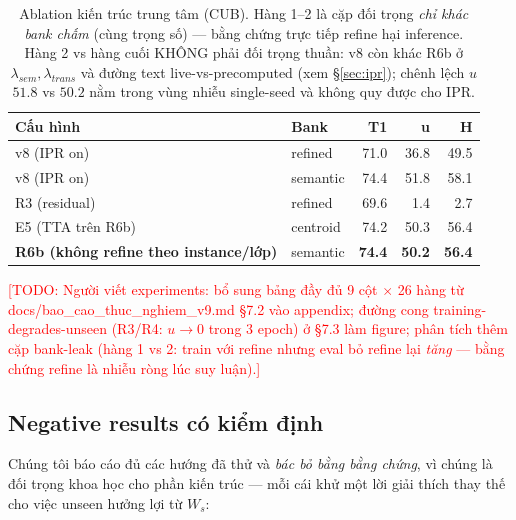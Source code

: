 \documentclass[10pt,twocolumn,letterpaper]{article}
\newcommand{\todo}[1]{\textcolor{red}{[TODO: #1]}}
\begin{document}
\begin{table}[t]
\centering
\caption{Ablation kiến trúc trung tâm (CUB). Hàng 1--2 là cặp đối trọng \emph{chỉ khác bank chấm} (cùng trọng số) — bằng chứng trực tiếp refine hại inference. Hàng 2 vs hàng cuối KHÔNG phải đối trọng thuần: v8 còn khác R6b ở $\lambda_{sem}, \lambda_{trans}$ và đường text live-vs-precomputed (xem §\ref{sec:ipr}); chênh lệch $u$ $51.8$ vs $50.2$ nằm trong vùng nhiễu single-seed và không quy được cho IPR.}
\label{tab:ablation-refine}
\small
\begin{tabular}{llrrr}
\toprule
Cấu hình & Bank & T1 & u & H \\
\midrule
v8 (IPR on) & refined & 71.0 & 36.8 & 49.5 \\
v8 (IPR on) & semantic & 74.4 & 51.8 & 58.1 \\
R3 (residual) & refined & 69.6 & 1.4 & 2.7 \\
E5 (TTA trên R6b) & centroid & 74.2 & 50.3 & 56.4 \\
\midrule
\textbf{R6b (không refine theo instance/lớp)} & semantic & \textbf{74.4} & \textbf{50.2} & \textbf{56.4} \\
\bottomrule
\end{tabular}
\end{table}

\todo{Người viết experiments: bổ sung bảng đầy đủ 9 cột $\times$ 26 hàng từ docs/bao\_cao\_thuc\_nghiem\_v9.md §7.2 vào appendix; đường cong training-degrades-unseen (R3/R4: $u \to 0$ trong 3 epoch) ở §7.3 làm figure; phân tích thêm cặp bank-leak (hàng 1 vs 2: train với refine nhưng eval bỏ refine lại \emph{tăng} — bằng chứng refine là nhiễu ròng lúc suy luận).}

\subsection{Negative results có kiểm định}
\label{sec:exp:negative}

Chúng tôi báo cáo đủ các hướng đã thử và \emph{bác bỏ bằng bằng chứng}, vì chúng là đối trọng khoa học cho phần kiến trúc — mỗi cái khử một lời giải thích thay thế cho việc unseen hưởng lợi từ $W_s$:
\end{document}
